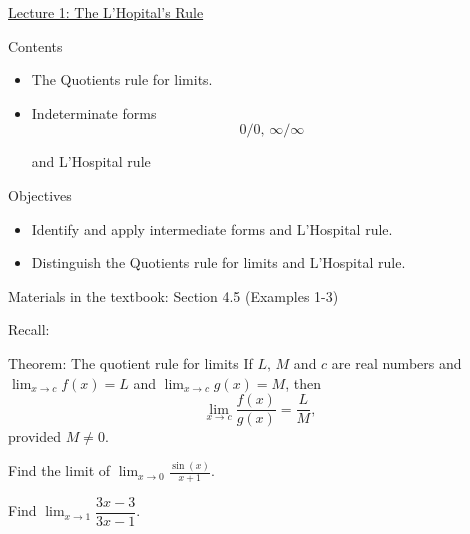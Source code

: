 
\begin{frame}
\begin{center}
\underline{Lecture 1: The L'Hopital's Rule}	
\end{center}		
Contents
\begin{itemize}
	\item   The Quotients rule for limits. 
	\item  Indeterminate forms \[ 0/0,\, \infty/ \infty \]
	
	and L'Hospital rule  
\end{itemize}



Objectives 
\begin{itemize}
	\item  Identify and apply intermediate forms and L'Hospital rule. 
	\item Distinguish the Quotients rule for limits and L'Hospital rule. 
\end{itemize}


Materials in the textbook:  Section 4.5 (Examples 1-3) 	
\end{frame}

\begin{frame}
Recall:

\begin{mybox}{Theorem: The quotient rule for limits}{}
	If $L,\,M$ and $c$  are real numbers and $\lim_{x \rightarrow c} f(x)=L$ and $\lim_{x \rightarrow c} g(x)=M$, then 
	\begin{equation*}
		\lim_{x \rightarrow c} \dfrac{f(x)}{g(x)}=\dfrac{L}{M},	
	\end{equation*}
	provided $M \neq 0.$
	
\end{mybox}	
	
\begin{myexample}{}{}
Find the limit of   $\displaystyle \lim_{x \to 0} \frac{\sin(x)}{x+1}$.	
	
\end{myexample}
		
	
	
\end{frame}


\begin{frame}

\begin{myexample}{}{}
	Find $\lim_{x \rightarrow 1} \dfrac{3x-3}{3x-1}.$	
\end{myexample}
		
	
\end{frame}

